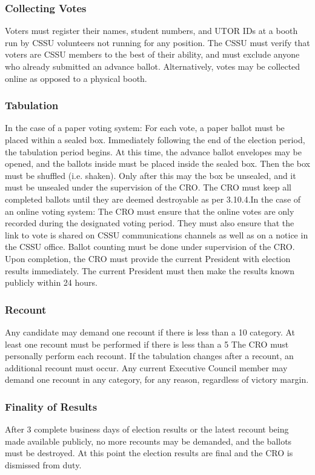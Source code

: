 \documentclass{article}
\begin{document}
\subsubsection{Collecting Votes} \label{sec:3.10.1}
Voters must register their names, student numbers, and UTOR IDs at a booth run by CSSU
volunteers not running for any position. The CSSU must verify that voters are CSSU members
to the best of their ability, and must exclude anyone who already submitted an advance ballot.
Alternatively, votes may be collected online as opposed to a physical booth.
\subsubsection{Tabulation} \label{sec:3.10.2}
In the case of a paper voting system:
For each vote, a paper ballot must be placed within a sealed box.
Immediately following the end of the election period, the tabulation period begins. At this time,
the
advance ballot envelopes may be opened, and the ballots inside must be placed inside the
sealed box.
Then the box must be shuffled (i.e. shaken). Only after this may the box be unsealed, and it
must be unsealed under the supervision of the CRO.
The CRO must keep all completed ballots until they are deemed destroyable as per 3.10.4.In the case of an online voting system:
The CRO must ensure that the online votes are only recorded during the designated voting
period. They must also ensure that the link to vote is shared on CSSU communications
channels as well as on a notice in the CSSU office.
Ballot counting must be done under supervision of the CRO. Upon completion, the CRO must
provide the current President with election results immediately. The current President must then
make the results known publicly within 24 hours.
\subsubsection{Recount} \label{sec:3.10.3}
Any candidate may demand one recount if there is less than a 10%
category.
At least one recount must be performed if there is less than a 5%
The CRO must personally perform each recount.
If the tabulation changes after a recount, an additional recount must occur.
Any current Executive Council member may demand one recount in any category, for any
reason, regardless of victory margin.
\subsubsection{Finality of Results} \label{sec:3.10.4}
After 3 complete business days of election results or the latest recount being made available
publicly, no more recounts may be demanded, and the ballots must be destroyed. At this point
the election results are final and the CRO is dismissed from duty.
\end{document}
